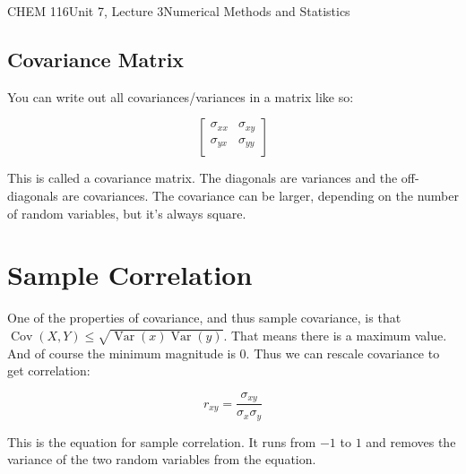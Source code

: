 \documentclass{article}
\DeclareMathOperator{\Var}{Var}
\DeclareMathOperator{\Cov}{Cov}
\begin{document}
\begin{tdoc}{CHEM 116}{Unit 7, Lecture 3}{Numerical Methods and Statistics}
\subsection{Covariance Matrix}

You can write out all covariances/variances in a matrix like so:

\[
\left[\begin{array}{lr}
\sigma_{xx} & \sigma_{xy}\\
\sigma_{yx} & \sigma_{yy}\\
  \end{array}\right]
\]

This is called a covariance matrix. The diagonals are variances and
the off-diagonals are covariances. The covariance can be larger,
depending on the number of random variables, but it's always square.


\section{Sample Correlation}

One of the properties of covariance, and thus sample covariance, is
that $\Cov(X,Y) \leq \sqrt{\Var(x)\Var(y)}$. That means there is a
maximum value. And of course the minimum magnitude is $0$. Thus we can
rescale covariance to get correlation:

\begin{equation}
  r_{xy} = \frac{\sigma_{xy}}{\sigma_x \sigma_y}
\end{equation}

This is the equation for sample correlation.  It runs from $-1$ to $1$
and removes the variance of the two random variables from the
equation.



\end{tdoc}
\end{document}
